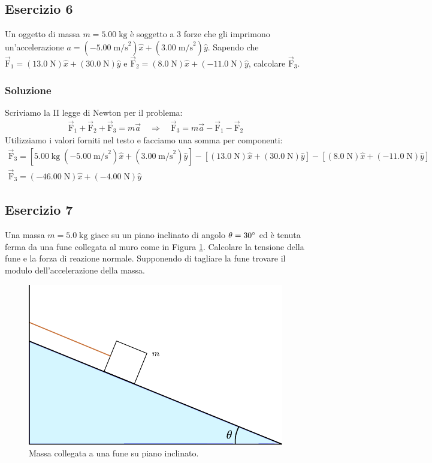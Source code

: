 \documentclass[12pt,a4paper]{book}
\begin{document}
\subsection*{Esercizio 6}
Un oggetto di massa $m=5.00\;\text{kg}$ è soggetto a 3 forze che gli imprimono un'accelerazione $a=(-5.00\;\text{m/s}^2)\hat{x}+(3.00\;\text{m/s}^2)\hat{y}$. Sapendo che $\vec{\text{F}}_1=(13.0\;\text{N})\hat{x}+(30.0\;\text{N})\hat{y}$ e $\vec{\text{F}}_2=(8.0\;\text{N})\hat{x}+(-11.0\;\text{N})\hat{y}$, calcolare $\vec{\text{F}}_3$.

\subsubsection*{Soluzione}
Scriviamo la II legge di Newton per il problema:
%
\begin{gather*}
\vec{\text{F}}_1+\vec{\text{F}}_2+\vec{\text{F}}_3=m\vec{a} \quad \Longrightarrow \quad \vec{\text{F}}_3= m\vec{a} - \vec{\text{F}}_1 - \vec{\text{F}}_2
\end{gather*}
%
Utilizziamo i valori forniti nel testo e facciamo una somma per componenti:
%
\begin{gather*}
\vec{\text{F}}_3= [5.00\;\text{kg} \; (-5.00\;\text{m/s}^2)\hat{x}+(3.00\;\text{m/s}^2)\hat{y}] - [(13.0\;\text{N})\hat{x}+(30.0\;\text{N})\hat{y}] - [(8.0\;\text{N})\hat{x}+(-11.0\;\text{N})\hat{y}] \\
\vec{\text{F}}_3= (-46.00\;\text{N})\hat{x}+(-4.00\;\text{N})\hat{y}
\end{gather*}
%



\subsection*{Esercizio 7}
Una massa $m=5.0\;\text{kg}$ giace su un piano inclinato di angolo $\theta=30\degree$ ed è tenuta ferma da una fune collegata al muro come in Figura \ref{fig:4-e-8-1}. Calcolare la tensione della fune e la forza di reazione normale. Supponendo di tagliare la fune trovare il modulo dell'accelerazione della massa.

\begin{figure}[!ht]
\centering
\includegraphics[scale=1]{e-8-1.pdf}
\caption{Massa collegata a una fune su piano inclinato.} 
\label{fig:4-e-8-1} 
\end{figure}
\end{document}
